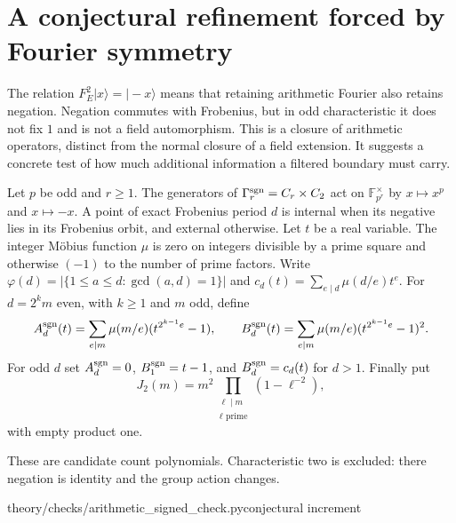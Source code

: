 \section{A conjectural refinement forced by Fourier symmetry}
\label{sec:signed-orbit-conjecture}

The relation $F_E^2|x\rangle=|-x\rangle$ means that retaining arithmetic
Fourier also retains negation. Negation commutes with Frobenius, but in
odd characteristic it does not fix $1$ and is not a field automorphism.
This is a closure of arithmetic operators, distinct from the normal
closure of a field extension. It suggests a concrete test of how much
additional information a filtered boundary must carry.

\begin{definition}
Let $p$ be odd and $r\geq1$. The generators of
$\Gamma_r^{\rm sgn}=C_r\times C_2$ act on
$\mathbb F_{p^r}^{\times}$ by $x\mapsto x^p$ and $x\mapsto-x$.
A point of exact Frobenius period $d$ is internal when its negative lies
in its Frobenius orbit, and external otherwise. Let $t$ be a real
variable. The integer M\"obius function $\mu$ is zero on integers divisible
by a prime square and otherwise $(-1)$ to the number of prime factors.
Write $\varphi(d)=|\{1\leq a\leq d:\gcd(a,d)=1\}|$ and
$c_d(t)=\sum_{e\mid d}\mu(d/e)t^e$.
For $d=2^k m$ even, with $k\geq1$ and $m$ odd, define
\[
 A_d^{\rm sgn}(t)=\sum_{e\mid m}\mu(m/e)(t^{2^{k-1}e}-1),\qquad
 B_d^{\rm sgn}(t)=\sum_{e\mid m}\mu(m/e)(t^{2^{k-1}e}-1)^2.
\]
For odd $d$ set $A_d^{\rm sgn}=0$, $B_1^{\rm sgn}=t-1$, and
$B_d^{\rm sgn}=c_d(t)$ for $d>1$. Finally put
\[
 J_2(m)=m^2\prod_{\substack{\ell\mid m\\\ell\text{ prime}}}
                      (1-\ell^{-2}),
\]
with empty product one.
\end{definition}
\begin{scope}
These are candidate count polynomials. Characteristic two is excluded:
there negation is identity and the group action changes.
\end{scope}
{theory/checks/arithmetic\_signed\_check.py}{conjectural increment}

